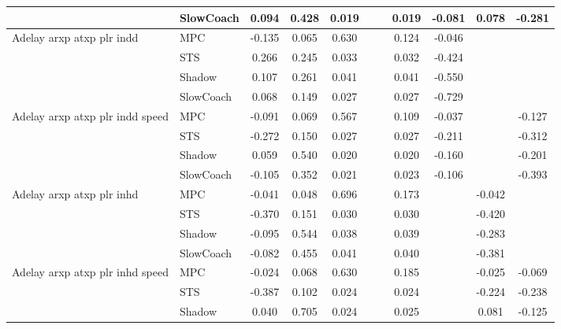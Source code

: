 \begin{tabular}{|l|l|*{9}{c|}}
                              & SlowCoach &    0.094 &     0.428 &     0.019 &     &     &  0.019 &  -0.081 &   0.078 &   -0.281 \\
\midrule
Adelay arxp atxp plr indd    & MPC &   -0.135 &     0.065 &     0.630 &     &     &  0.124 &  -0.046 &      &       \\
                              & STS &    0.266 &     0.245 &     0.033 &     &     &  0.032 &  -0.424 &      &       \\
                              & Shadow &    0.107 &     0.261 &     0.041 &     &     &  0.041 &  -0.550 &      &       \\
                              & SlowCoach &    0.068 &     0.149 &     0.027 &     &     &  0.027 &  -0.729 &      &       \\
\midrule
Adelay arxp atxp plr indd speed    & MPC &   -0.091 &     0.069 &     0.567 &     &     &  0.109 &  -0.037 &      &   -0.127 \\
                              & STS &   -0.272 &     0.150 &     0.027 &     &     &  0.027 &  -0.211 &      &   -0.312 \\
                              & Shadow &    0.059 &     0.540 &     0.020 &     &     &  0.020 &  -0.160 &      &   -0.201 \\
                              & SlowCoach &   -0.105 &     0.352 &     0.021 &     &     &  0.023 &  -0.106 &      &   -0.393 \\
\midrule
Adelay arxp atxp plr inhd    & MPC &   -0.041 &     0.048 &     0.696 &     &     &  0.173 &      &  -0.042 &       \\
                              & STS &   -0.370 &     0.151 &     0.030 &     &     &  0.030 &      &  -0.420 &       \\
                              & Shadow &   -0.095 &     0.544 &     0.038 &     &     &  0.039 &      &  -0.283 &       \\
                              & SlowCoach &   -0.082 &     0.455 &     0.041 &     &     &  0.040 &      &  -0.381 &       \\
\midrule
Adelay arxp atxp plr inhd speed    & MPC &   -0.024 &     0.068 &     0.630 &     &     &  0.185 &      &  -0.025 &   -0.069 \\
                              & STS &   -0.387 &     0.102 &     0.024 &     &     &  0.024 &      &  -0.224 &   -0.238 \\
                              & Shadow &    0.040 &     0.705 &     0.024 &     &     &  0.025 &      &   0.081 &   -0.125 \\

\end{tabular}
